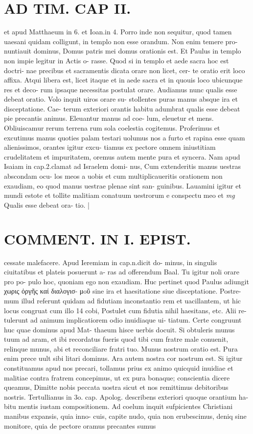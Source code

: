 \documentclass{article}
\begin{document}
\begin{pages}
\section*{AD TIM. CAP II. }
\marginpar{[ p.118 ]}\pstart et apud Matthaeum in 6. et Ioan.in 4. Porro inde non sequitur, quod tamen uaesani quidam colligunt, in templo non esse orandum. Non enim temere pro- nuntiauit dominus, Domus patris mei domus orationis est. Et Paulus in templo non impie legitur in Actis o- rasse. Quod si in templo et aede sacra hoc est doctri- nae precibus et sacramentis dicata orare non licet, cer- te oratio erit loco affixa. Atqui libera est, licet itaque et in aede sacra et in quouis loco ubicunque res et deco- rum ipsaque necessitas postulat orare. Audiamus nunc qualis esse debeat oratio. Volo inquit uiros orare su- stollentes puras manus absque ira et disceptatione. Cae- terum exteriori orantis habitu adumbrat qualis esse debeat pie precantis animus. Eleuantur manus ad coe- lum, eleuetur et mens. Obliuiscamur rerum terrena rum sola coelestia cogitemus. Proferimus et excutimus manus quoties palam testari uolumus nos a furto et rapina esse quam alienissimos, orantes igitur excu- tiamus ex pectore omnem iniustitiam crudelitatem et impuritatem, oremus autem mente pura et syncera. Nam apud Isaiam in cap.2.clamat ad Israelem domi- nus, Cum extenderitis manus uestras abscondam ocu- los meos a uobis et cum multiplicaueritis orationem non exaudiam, eo quod manus uestrae plenae sint san- guinibus. Lauamini igitur et mundi estote et tollite malitiam conatuum uestrorum e conspectu meo et  \pend
\textit{mg}
\footnotesize Qualis esse debeat ora- tio. 
\normalsize| 
\section*{COMMENT. IN I. EPIST. }\pstart cessate malefacere. Apud Ieremiam in cap.n.dicit do- minus, in singulis ciuitatibus et plateis posuerunt a- ras ad offerendum Baal. Tu igitur noli orare pro po- pulo hoc, quoniam ego non exaudiam. Huc pertinet quod Paulus adiungit χωρις ὀργῆς καί διαλογισ- μoῦ sine ira et haesitatione siue disceptatione. Postre- mum illud referunt quidam ad fidutiam inconstantio rem et uacillantem, ut hic locus congruat cum illo 14 cobi, Postulet cum fidutia nihil haesitans, etc. Alii re- tulerunt ad animum implicatiorem odio inuidiaque ui- tiatum. Certe congruunt huc quae dominus apud Mat- thaeum hisce uerbis docuit. Si obtuleris munus tuum ad aram, et ibi recordatus fueris quod tibi cum fratre male conuenit, relinque munus, abi et reconciliare fratri tuo. Munus nostrum oratio est. Pura enim prece uult sibi litari dominus. Ara autem nostra cor nostrum est. Si igitur constituamus apud nos precari, tollamus prius ex animo quicquid inuidiae et malitiae contra fratrem concepimus, ut ex pura bonaque; conscientia dicere queamus, Dimitte nobis peccata uostra sicut et nos remittimus debitoribus nostris. Tertullianus in 3o. cap. Apolog. describens exteriori quoque orantium ha- bitu mentis iustam compositionem. Ad coelum inquit sufpicientes Christiani manibus expansis, quia inno- cuis, capite nudo, quia non erubescimus, deniq sine monitore, quia de pectore oramus precantes sumus  \pend

\end{pages}
\end{document}
